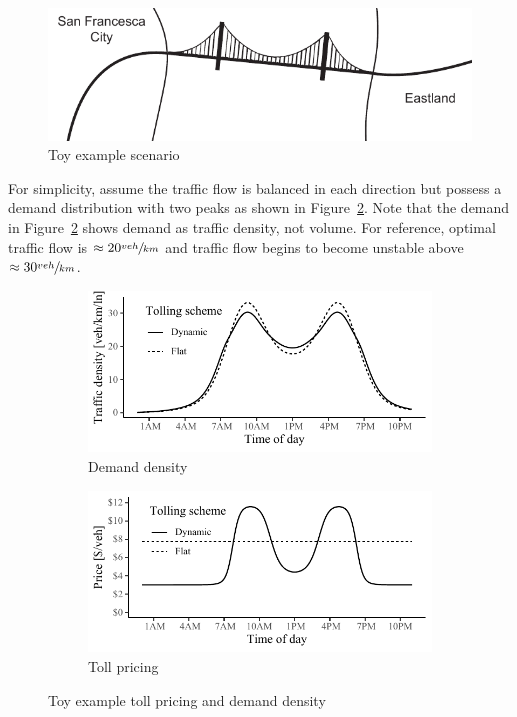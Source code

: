 \documentclass{article}
\begin{document}
 \begin{figure}[h]
 	\centering
 	\includegraphics[width=\linewidth]{figures/silvergate}
 	\caption{Toy example scenario}
 	\label{fig:toymap}
 \end{figure}
 
 \noindent For simplicity, assume the traffic flow is balanced in each direction but possess a demand distribution with two peaks as shown in Figure~\ref{fig:toydem}. Note that the demand in Figure~\ref{fig:toydem} shows demand as traffic density, not volume. For reference, optimal traffic flow is $\approx 20 \sfrac{veh}{km}$ and traffic flow begins to become unstable above $\approx 30 \sfrac{veh}{km}$.
   
 \begin{figure}[h]
     \begin{subfigure}[h]{\linewidth}
     	\centering
     	\includegraphics[width=\textwidth]{figures/toydemand}
     	\caption{Demand density}
     	\label{fig:toydem}
     \end{subfigure}
     \begin{subfigure}[h]{\linewidth}
     	\centering
     	\includegraphics[width=\textwidth]{figures/toytoll}
     	\caption{Toll pricing}
     	\label{fig:toytoll}
     \end{subfigure}
     \caption{Toy example toll pricing and demand density}
     \label{fig:toymodel}
 \end{figure}
 
\end{document}
